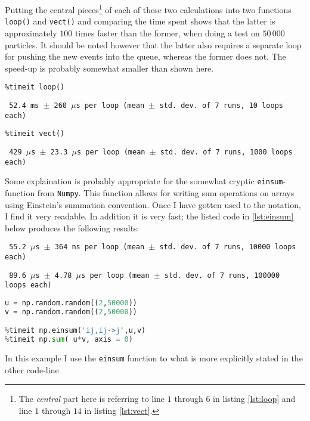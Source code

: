 Putting the central pieces\footnote{The \textit{central} part here is referring to line $1$ through $6$ in listing \ref{lst:loop} and line $1$ through $14$ in listing \ref{lst:vect}.} of each of these two calculations into two functions \texttt{loop()} and \texttt{vect()} and comparing the time spent shows that the latter is approximately $100$ times faster than the former, when doing a test on $50\,000$ particles. It should be noted however that the latter also requires a separate loop for pushing the new events into the queue, whereas the former does not. The speed-up is probably somewhat smaller than shown here.

\begin{lstlisting}
%timeit loop()
\end{lstlisting}
\texttt{\small
52.4 ms $\pm$ 260 $\mu$s per loop (mean $\pm$ std. dev. of 7 runs, 10 loops each)
}

\begin{lstlisting}
%timeit vect()
\end{lstlisting}
\texttt{\small
429 $\mu$s $\pm$ 23.3 $\mu$s per loop (mean $\pm$ std. dev. of 7 runs, 1000 loops each)
}


Some explaination is probably appropriate for the somewhat cryptic \texttt{einsum}-function from \texttt{Numpy}. This function allows for writing sum operations on arrays using Einstein's summation convention. Once I have gotten used to the notation, I find it very readable. In addition it is very fast; the listed code in \ref{lst:einsum} below produces the following results: 

\texttt{\small
55.2 $\mu$s $\pm$ 364 ns per loop (mean $\pm$ std. dev. of 7 runs, 10000 loops each)
}

\texttt{\small 
89.6 $\mu$s $\pm$ 4.78 $\mu$s per loop (mean $\pm$ std. dev. of 7 runs, 100000 loops each)
}
\begin{lstlisting}[language=Python,label={lst:einsum}]
u = np.random.random((2,50000))
v = np.random.random((2,50000))

%timeit np.einsum('ij,ij->j',u,v)
%timeit np.sum( u*v, axis = 0)
\end{lstlisting}

In this example I use the \texttt{einsum} function to what is more explicitly stated in the other code-line